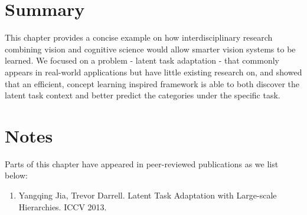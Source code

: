 \section{Summary}
This chapter provides a concise example on how interdisciplinary research combining vision and cognitive science would allow smarter vision systems to be learned. We focused on a problem - latent task adaptation - that commonly appears in real-world applications but have little existing research on, and showed that an efficient, concept learning inspired framework is able to both discover the latent task context and better predict the categories under the specific task.

\section*{Notes}
Parts of this chapter have appeared in peer-reviewed publications as we list below:
\begin{enumerate}
\item Yangqing Jia, Trevor Darrell. Latent Task Adaptation with Large-scale Hierarchies. ICCV 2013.
\end{enumerate}